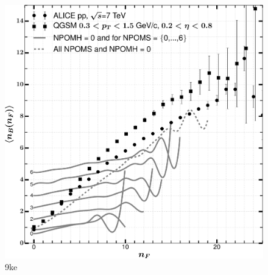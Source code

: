 \documentclass[]{article}
\begin{document}
\begin{figure}
    \centering
\includegraphics[scale=0.3]{nbnf_allnpoms_0npomh.pdf}
\caption{9ke}
\end{figure}
\end{document}
